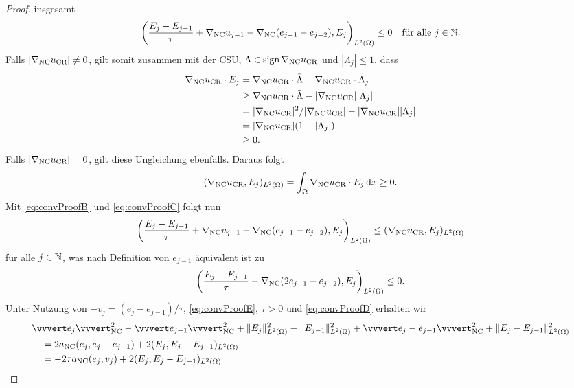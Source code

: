 \begin{proof}
  insgesamt
  \begin{align}
    \label{eq:convProofB}
    \left(\frac{E_j-E_{j-1}}{\tau}+ \nabla_\textup{NC} u_{j-1}-\nabla_\textup{NC}
    (e_{j-1}-e_{j-2}),E_j\right)_{L^2(\Omega)}\leq 0\quad\text{für alle }
    j\in\mathbb{N}.
  \end{align}
  Falls $|\nabla_\textup{NC} u_\textup{CR}|\neq 0$, gilt somit zusammen mit
  der CSU, $\bar\Lambda\in\operatorname{sign}\nabla_\textup{NC}u_\textup{CR}$ und $|\Lambda_j|\leq 1$,  dass
  \begin{align*}
    \nabla_\textup{NC}u_\textup{CR}\cdot E_j 
    &=
    \nabla_\textup{NC}u_\textup{CR}\cdot\bar\Lambda - \nabla_\textup{NC}u_\textup{CR}\cdot\Lambda_j\\
    &\geq 
    \nabla_\textup{NC}u_\textup{CR}\cdot\bar\Lambda - |\nabla_\textup{NC}u_\textup{CR}||\Lambda_j| \\
    &=
    |\nabla_\textup{NC}u_\textup{CR}|^2/|\nabla_\textup{NC}u_\textup{CR}|-|\nabla_\textup{NC}u_\textup{CR}||\Lambda_j| \\
    &= 
    |\nabla_\textup{NC}u_\textup{CR}|(1-|\Lambda_j|)\\
    &\geq
    0. 
  \end{align*}
  Falls $|\nabla_\textup{NC}u_\textup{CR}|=0$, gilt diese Ungleichung ebenfalls.
  Daraus folgt
  \begin{align}
    \label{eq:convProofC}
    (\nabla_\textup{NC}u_\textup{CR},E_j)_{L^2(\Omega)}=\int_\Omega \nabla_\textup{NC}u_\textup{CR}\cdot E_j\,\mathrm{d}x\geq 0.
  \end{align}
  Mit \eqref{eq:convProofB} und \eqref{eq:convProofC} folgt nun
  \begin{align*}
    \left( \frac{E_j-E_{j-1}}{\tau}+ \nabla_\textup{NC} u_{j-1}
    -\nabla_{\textup{NC}}(e_{j-1}-e_{j-2}),E_j\right)_{L^2(\Omega)}
    \leq
    (\nabla_\textup{NC}u_\textup{CR},E_j)_{L^2(\Omega)}
  \end{align*}
  für alle $j\in\mathbb{N}$, was nach Definition von $e_{j-1}$
  äquivalent ist zu
  \begin{align}
    \label{eq:convProofD}
    \left( \frac{E_j-E_{j-1}}{\tau} 
    -\nabla_\textup{NC}(2e_{j-1}-e_{j-2}),E_j\right)_{L^2(\Omega)}\leq 0.
  \end{align}
  Unter Nutzung von $-v_j=(e_j-e_{j-1})/\tau$, \eqref{eq:convProofE}, $\tau>0$
  und \eqref{eq:convProofD} erhalten wir 
  \begin{align*}
    &\vvvert e_j \vvvert^2_\nc   -
    \vvvert e_{j-1}\vvvert_\nc^2 +
    \Vert E_j \Vert_{L^2(\Omega)}^2 - \Vert E_{j-1}\Vert_{L^2(\Omega)}^2 +
    \vvvert e_j-e_{j-1}\vvvert_\nc^2 +
    \Vert E_j - E_{j-1} \Vert_{L^2(\Omega)}^2\\
    &\quad =
    2a_\nc(e_j,e_j-e_{j-1}) + 2(E_j,E_j-E_{j-1})_{L^2(\Omega)}\\
    &\quad =
    -2\tau a_\nc(e_j,v_j) + 2(E_j,E_j-E_{j-1})_{L^2(\Omega)}\\

\end{align*}
\end{proof}

